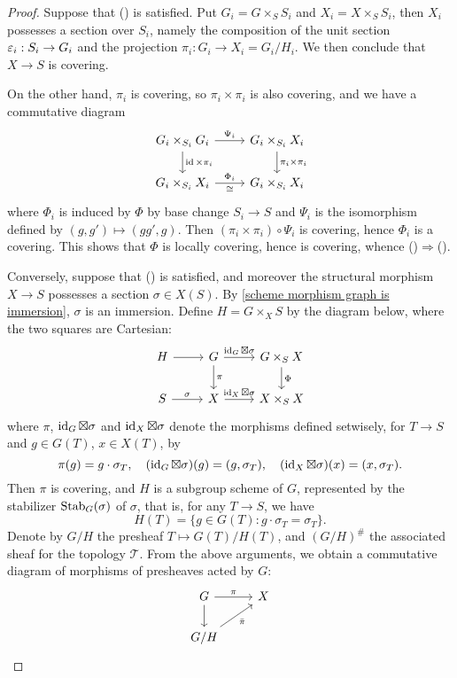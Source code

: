 \begin{proof}
Suppose that () is satisfied. Put $G_i=G\times_SS_i$ and $X_i=X\times_SS_i$, then $X_i$ possesses a section over $S_i$, namely the composition of the unit section $\varepsilon_i:S_i\to G_i$ and the projection $\pi_i:G_i\to X_i=G_i/H_i$. We then conclude that $X\to S$ is covering.\par
On the other hand, $\pi_i$ is covering, so $\pi_i\times\pi_i$ is also covering, and we have a commutative diagram
\[\begin{tikzcd}
G_i\times_{S_i}G_i\ar[r,"\Psi_i"]\ar[d,"\id\times\pi_i"]&G_i\times_{S_i}X_i\ar[d,"\pi_i\times\pi_i"]\\
G_i\times_{S_i}X_i\ar[r,"\Phi_i","\cong"']&G_i\times_{S_i}X_i
\end{tikzcd}\]
where $\Phi_i$ is induced by $\Phi$ by base change $S_i\to S$ and $\Psi_i$ is the isomorphism defined by $(g,g')\mapsto(gg',g)$. Then $(\pi_i\times\pi_i)\circ\Psi_i$ is covering, hence $\Phi_i$ is a covering. This shows that $\Phi$ is locally covering, hence is covering, whence ()$\Rightarrow$().\par
Conversely, suppose that () is satisfied, and moreover the structural morphism $X\to S$ possesses a section $\sigma\in X(S)$. By \cref{scheme morphism graph is immersion}, $\sigma$ is an immersion. Define $H=G\times_XS$ by the diagram below, where the two squares are Cartesian:
\[\begin{tikzcd}
H\ar[r]&G\ar[r,"\id_G\boxtimes\sigma"]\ar[d,"\pi"]&G\times_SX\ar[d,"\Phi"]\\
S\ar[r,"\sigma"]&X\ar[r,"\id_X\boxtimes\sigma"]&X\times_SX
\end{tikzcd}\]
where $\pi$, $\operatorname{id}_G\boxtimes\sigma$ and $\operatorname{id}_X\boxtimes\sigma$ denote the morphisms defined setwisely, for $T\to S$ and $g\in G(T)$, $x\in X(T)$, by
\[\pi(g)=g\cdot\sigma_T,\quad (\operatorname{id}_G\boxtimes\sigma)(g)=(g,\sigma_T),\quad (\operatorname{id}_X\boxtimes\sigma)(x)=(x,\sigma_T).\]
Then $\pi$ is covering, and $H$ is a subgroup scheme of $G$, represented by the stabilizer $\mathrm{Stab}_G(\sigma)$ of $\sigma$, that is, for any $T\to S$, we have
\[H(T)=\{g\in G(T):g\cdot\sigma_T=\sigma_T\}.\]
Denote by $G/H$ the presheaf $T\mapsto G(T)/H(T)$, and $(G/H)^\#$ the associated sheaf for the topology $\mathcal{T}$. From the above arguments, we obtain a commutative diagram of morphisms of presheaves acted by $G$:
\[\begin{tikzcd}
G\ar[r,"\pi"]\ar[d]&X\\
G/H\ar[ru,swap,"\bar{\pi}"]
\end{tikzcd}\]

\end{proof}
